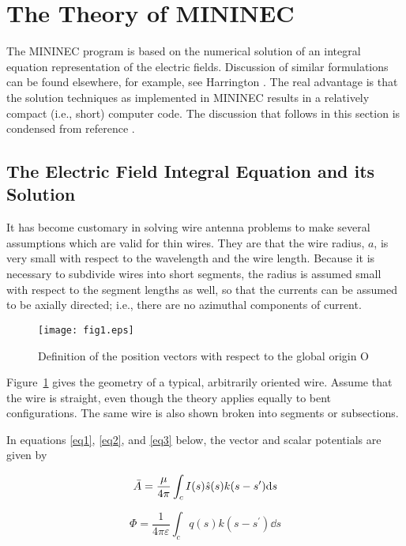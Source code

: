 \documentclass[12pt]{article}
\begin{document}
\section{The Theory of MININEC}
The MININEC program is based on the numerical solution of an integral
equation representation of the electric fields. Discussion of similar
formulations can be found elsewhere, for example, see Harrington
\cite{r5}. The real advantage is that the solution techniques as
implemented in MININEC results in a relatively compact (i.e., short)
computer code. The discussion that follows in this section is condensed
from reference \cite{r2}.

\subsection{The Electric Field Integral Equation and its Solution}
It has become customary in solving wire antenna problems to make several
assumptions which are valid for thin wires. They are that the wire
radius, $a$, is very small with respect to the wavelength and the wire
length. Because it is necessary to subdivide wires into short segments,
the radius is assumed small with respect to the segment lengths as well,
so that the currents can be assumed to be axially directed; i.e., there
are no azimuthal components of current.

\begin{figure}[htb]
\centerline{\texttt{[image: fig1.eps]}}
\caption{Definition of the position vectors with respect to the global
origin O}
\label{fig1}
\end{figure}
\afterpage\clearpage

Figure~\ref{fig1} gives the geometry of a typical, arbitrarily oriented
wire. Assume that the wire is straight, even though the theory applies
equally to bent configurations. The same wire is also shown broken into
segments or subsections.

In equations \eqref{eq1}, \eqref{eq2}, and \eqref{eq3} below, the vector and
scalar potentials are given by

\begin{equation}
\bar{A} = \frac{\mu}{4\pi} \int_c I(s)\hat{s}(s)k(s-s^\prime)\mathrm{d}s
\label{eq1}
\end{equation}

\begin{equation}
\Phi = \frac{1}{4\pi\varepsilon} \int_c q(s)k(s-s^\prime)\dd{s}
\label{eq2}
\end{equation}
\end{document}
